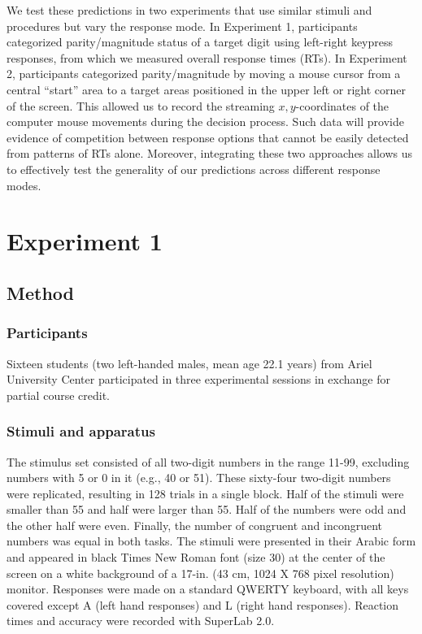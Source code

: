 \documentclass[english,man]{apa6}
\theoremstyle{definition}
\theoremstyle{definition}
\theoremstyle{definition}
\theoremstyle{remark}
\begin{document}
We test these predictions in two experiments that use similar stimuli
and procedures but vary the response mode. In Experiment 1, participants
categorized parity/magnitude status of a target digit using left-right
keypress responses, from which we measured overall response times (RTs).
In Experiment 2, participants categorized parity/magnitude by moving a
mouse cursor from a central \enquote{start} area to a target areas
positioned in the upper left or right corner of the screen. This allowed
us to record the streaming \(x,y\)-coordinates of the computer mouse
movements during the decision process. Such data will provide evidence
of competition between response options that cannot be easily detected
from patterns of RTs alone. Moreover, integrating these two approaches
allows us to effectively test the generality of our predictions across
different response modes.

\section{Experiment 1}\label{experiment-1}

\subsection{Method}\label{method}

\subsubsection{Participants}\label{participants}

Sixteen students (two left-handed males, mean age 22.1 years) from Ariel
University Center participated in three experimental sessions in
exchange for partial course credit.

\subsubsection{Stimuli and apparatus}\label{stimuli-and-apparatus}

The stimulus set consisted of all two-digit numbers in the range 11-99,
excluding numbers with 5 or 0 in it (e.g., 40 or 51). These sixty-four
two-digit numbers were replicated, resulting in 128 trials in a single
block. Half of the stimuli were smaller than 55 and half were larger
than 55. Half of the numbers were odd and the other half were even.
Finally, the number of congruent and incongruent numbers was equal in
both tasks. The stimuli were presented in their Arabic form and appeared
in black Times New Roman font (size 30) at the center of the screen on a
white background of a 17-in. (43 cm, 1024 X 768 pixel resolution)
monitor. Responses were made on a standard QWERTY keyboard, with all
keys covered except A (left hand responses) and L (right hand
responses). Reaction times and accuracy were recorded with SuperLab 2.0.
\end{document}
